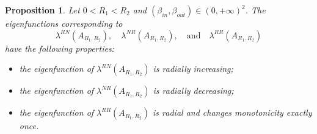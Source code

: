 \documentclass[oneside,a4paper,11pt,notitlepage]{article}
\theoremstyle{plain}
\numberwithin{teor}{section}
\numberwithin{equation}{section}
\theoremstyle{definition}
\theoremstyle{plain}
\theoremstyle{plain}
\newtheorem{prop}[prop]{Proposition}
\theoremstyle{plain}
\theoremstyle{plain}
\theoremstyle{definition}
\theoremstyle{definition}
\theoremstyle{plain}
\begin{document}
\begin{prop}\label{autofunzioni}
Let $0 < R_1 < R_2$ and $(\beta_{in}, \beta_{out}) \in (0, + \infty)^2$. The eigenfunctions corresponding to 
\[
\lambda^{RN} (A_{R_1,R_2}), \quad \lambda^{NR} (A_{R_1,R_2}), \quad \text{and} \quad \lambda^{RR} (A_{R_1,R_2})
\] 
have the following properties:
\begin{itemize}
    \item[(i)] the eigenfunction of $\lambda^{RN} (A_{R_1,R_2})$ is radially increasing;
    \item[(ii)] the eigenfunction of $\lambda^{NR} (A_{R_1,R_2})$ is radially decreasing;
    \item[(iii)] the eigenfunction of $\lambda^{RR} (A_{R_1,R_2})$ is radial and changes monotonicity exactly once.
\end{itemize}
\end{prop}
\end{document}
